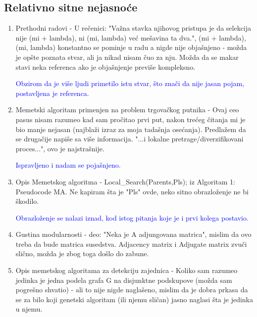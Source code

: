 \documentclass[a4paper]{report}
\newcommand{\odgovor}[1]{\textcolor{blue}{#1}}
\begin{document}
\subsection{Relativno sitne nejasnoće}
\begin{enumerate}
  
  \odgovor{1. Dodata rečenica : Autori HEAD-a su izabrali samo dve jedinke sa ciljem da smanje veliki broj parametara koji čine algoritam}
  
  \odgovor{2. Meni deluje da u standardnom genetskom algoritmu, najbolja rešenja dve susedne generacije se razlikuju za $"$nijansu$"$. Kako je ovde ubačena lokalna pretraga za unapređenje svake jedinke, moguće je da se dve jedinke iste generacije znatno razlikuju, a pogotovo najbolja rešenja dve susedne generacije. Ovo je heuristika autora HEAD-a; pretpostavljaju da se prethodno najbolje rešenje dovoljno razlikuje od jedinki trenutne generacije, pa se to rešenja vraća u igru zamenom sa jednom od novonastalih jedinki.}  
  
  \item Prethodni radovi - U rečenici: "Važna stavka njihovog pristupa je da selekcija nije (mi + lambda), ni (mi, lambda) već mešavina ta dva.", (mi + lambda), (mi, lambda) konstantno se pominje u radu a nigde nije objašnjeno - možda je opšte poznata stvar, ali ja nikad nisam čuo za nju. Možda da se makar stavi neka referenca ako je objašnjenje previše kompleksno. 
  
  \odgovor{ Obzirom da je više ljudi primetilo istu stvar, što znači da nije jasan pojam, postavljena je referenca. }
  
  \item Memetski algoritam primenjen na problem trgovačkog putnika - Ovaj ceo pasus nisam razumeo kad sam pročitao prvi put, nakon trećeg čitanja mi je bio manje nejasan (najblaži izraz za moja tadašnja osećanja). Predlažem da se drugačije napiše sa više informacija. "...i lokalne pretrage/diverzifikovani proces...", ovo je najstrašnije. 
  
   \odgovor{ Ispravljeno i nadam se pojašnjeno. }
   
   \item Opis Memetskog algoritma - Local\_Search(Parents,Pls); iz Algoritam 1: Pseudocode MA. Ne kapiram šta je "Pls" ovde, neko sitno obrazloženje ne bi škodilo. 
   
    \odgovor{ Obrazloženje se nalazi iznad, kod istog pitanja koje je i prvi kolega postavio. } 
    
 \item Gustina modularnosti - deo: "Neka je A adjungovana matrica", mislim da ovo treba da bude matrica susedstva. Adjacency matrix i Adjugate matrix zvuči slično, možda je zbog toga došlo do zabune.
  \item Opis memetskog algoritama za detekciju zajednica - Koliko sam razumeo jedinka je jedna podela grafa G na disjunktne podskupove (možda sam pogrešno shvatio) - ali to nije nigde naglašeno, mislim da je dobra prkasa da se za bilo koji genetski algoritam (ili njemu sličan) jasno naglasi šta je jedinka u njemu.
\end{enumerate}
\end{document}

